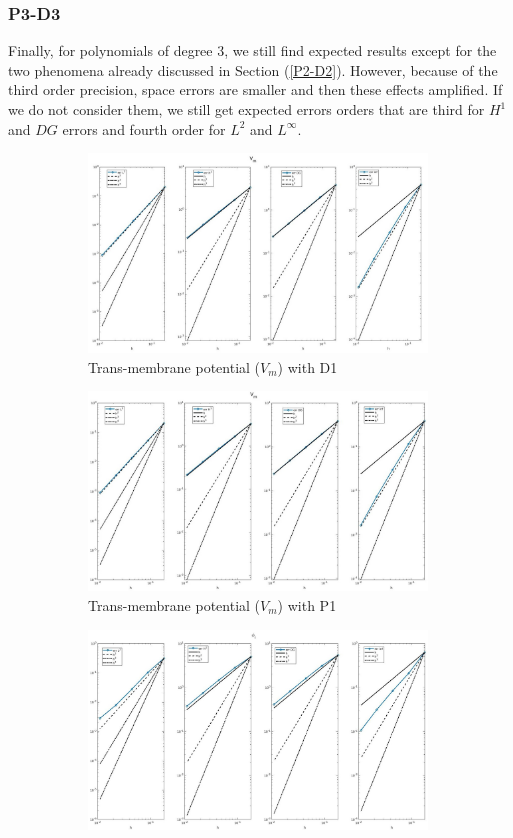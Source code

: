\documentclass[a4paper,11pt]{article}
\begin{document}
\subsubsection{P3-D3}
\noindent Finally, for polynomials of degree 3, we still find expected results except for the two phenomena already discussed in Section (\ref{P2-D2}). However, because of the third order precision, space errors are smaller and then these effects amplified. If we do not consider them, we still get expected errors orders that are third for $H^1$ and $DG$ errors and fourth order for $L^2$ and $L^\infty$. \newpage
{} 
\begin{figure}[h] \caption{Comparison between Dubiner and FEM with first order polynomials} \label{P1-D1_plot}
\begin{subfigure}{0.5\textwidth}
\includegraphics[width = 9cm]{./D1_Vm_1.jpg}
\caption{Trans-membrane potential  ($V_m$) with D1}
\end{subfigure}
\begin{subfigure}{0.5\textwidth}
\includegraphics[width =9cm]{./P1_Vm_1.jpg}
\caption{Trans-membrane potential  ($V_m$) with P1}
\end{subfigure}
\begin{subfigure}{0.5\textwidth}
\includegraphics[width = 9cm]{./D1_Phii_1.jpg}

\end{subfigure}
\end{figure}
\end{document}
